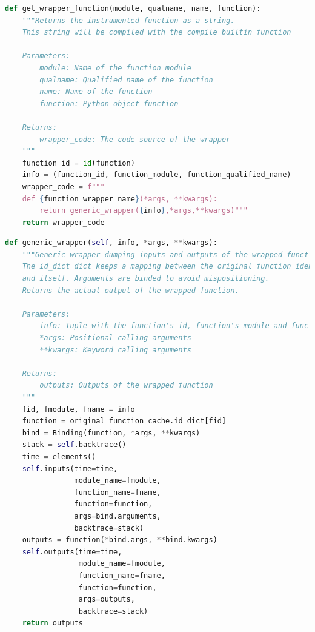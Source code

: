 \documentclass[11pt]{article}
\newcommand{\pytracer}[0]{PyTracer\xspace}
\begin{document}
\begin{listing}
    \centering
\begin{lstlisting}[language=Python,style=customPython]
def get_wrapper_function(module, qualname, name, function):
    """Returns the instrumented function as a string.
    This string will be compiled with the compile builtin function
    
    Parameters:
        module: Name of the function module
        qualname: Qualified name of the function
        name: Name of the function
        function: Python object function
        
    Returns:
        wrapper_code: The code source of the wrapper
    """
    function_id = id(function)
    info = (function_id, function_module, function_qualified_name)
    wrapper_code = f"""
    def {function_wrapper_name}(*args, **kwargs):
        return generic_wrapper({info},*args,**kwargs)"""
    return wrapper_code
\end{lstlisting}
    \caption{Function to create the instrumented version of a function.
    \pytracer uses the identifier of the function instead of the 
    actual function to handle aliases and avoid duplicate instrumentation.}
    \label{fig:wrapper_creation}
\end{listing}


\begin{listing}
    \centering
\begin{lstlisting}[language=Python,style=customPython,]
def generic_wrapper(self, info, *args, **kwargs):
    """Generic wrapper dumping inputs and outputs of the wrapped function.
    The id_dict dict keeps a mapping between the original function identifier
    and itself. Arguments are binded to avoid mispositioning.
    Returns the actual output of the wrapped function.
    
    Parameters:
        info: Tuple with the function's id, function's module and function's name
        *args: Positional calling arguments
        **kwargs: Keyword calling arguments
    
    Returns:
        outputs: Outputs of the wrapped function
    """
    fid, fmodule, fname = info
    function = original_function_cache.id_dict[fid]
    bind = Binding(function, *args, **kwargs)
    stack = self.backtrace()
    time = elements()
    self.inputs(time=time,
                module_name=fmodule,
                function_name=fname,
                function=function,
                args=bind.arguments,
                backtrace=stack)
    outputs = function(*bind.args, **bind.kwargs)
    self.outputs(time=time,
                 module_name=fmodule,
                 function_name=fname,
                 function=function,
                 args=outputs,
                 backtrace=stack)
    return outputs
\end{lstlisting}
    \caption{\pytracer's generic wrapper function that dumps
    the inputs and outputs of the wrapped function.}
    \label{fig:generic_wrapper}
\end{listing}
\end{document}
